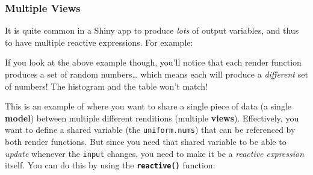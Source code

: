 \documentclass[]{book}
\newenvironment{Shaded}{\begin{snugshade}}{\end{snugshade}}
\newcommand{\KeywordTok}[1]{\textcolor[rgb]{0.13,0.29,0.53}{\textbf{#1}}}
\newcommand{\DataTypeTok}[1]{\textcolor[rgb]{0.13,0.29,0.53}{#1}}
\newcommand{\DecValTok}[1]{\textcolor[rgb]{0.00,0.00,0.81}{#1}}
\newcommand{\StringTok}[1]{\textcolor[rgb]{0.31,0.60,0.02}{#1}}
\newcommand{\CommentTok}[1]{\textcolor[rgb]{0.56,0.35,0.01}{\textit{#1}}}
\newcommand{\ControlFlowTok}[1]{\textcolor[rgb]{0.13,0.29,0.53}{\textbf{#1}}}
\newcommand{\OperatorTok}[1]{\textcolor[rgb]{0.81,0.36,0.00}{\textbf{#1}}}
\newcommand{\NormalTok}[1]{#1}
\theoremstyle{definition}
\theoremstyle{definition}
\theoremstyle{remark}
\begin{document}
\subsubsection{Multiple Views}\label{multiple-views}

It is quite common in a Shiny app to produce \emph{lots} of output
variables, and thus to have multiple reactive expressions. For example:

\begin{Shaded}
\end{Shaded}

If you look at the above example though, you'll notice that each render
function produces a set of random numbers\ldots{} which means each will
produce a \emph{different} set of numbers! The histogram and the table
won't match!

This is an example of where you want to share a single piece of data (a
single \textbf{model}) between multiple different renditions (multiple
\textbf{views}). Effectively, you want to define a shared variable (the
\texttt{uniform.nums}) that can be referenced by both render functions.
But since you need that shared variable to be able to \emph{update}
whenever the \texttt{input} changes, you need to make it be a
\emph{reactive expression} itself. You can do this by using the
\textbf{\texttt{reactive()}} function:
\end{document}
